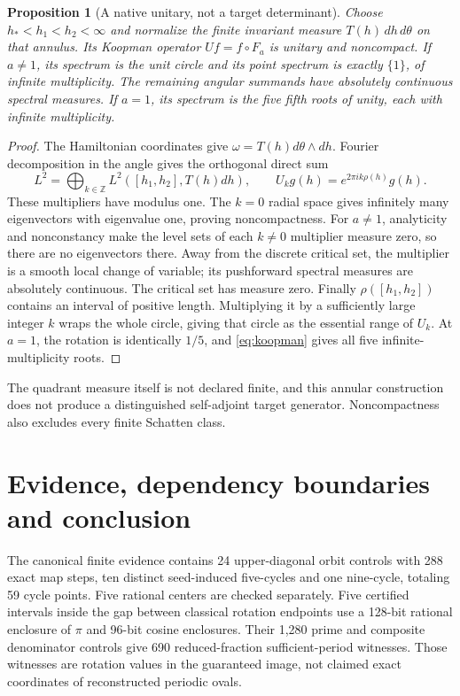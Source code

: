 \documentclass[10pt]{article}
\newcommand{\Z}{\mathbb Z}
\newtheorem{proposition}{Proposition}
\begin{document}
\begin{proposition}[A native unitary, not a target determinant]
Choose $h_*<h_1<h_2<\infty$ and normalize the finite invariant measure
$T(h)\,dh\,d\theta$ on that annulus. Its Koopman operator $Uf=f\circ F_a$
is unitary and noncompact. If $a\ne1$, its spectrum is the unit circle
and its point spectrum is exactly $\{1\}$, of infinite multiplicity.
The remaining angular summands have absolutely continuous spectral
measures. If $a=1$, its spectrum is the five fifth roots of unity, each
with infinite multiplicity.
\end{proposition}
\begin{proof}
The Hamiltonian coordinates give $\omega=T(h)d\theta\wedge dh$.
Fourier decomposition in the angle gives the orthogonal direct sum
\begin{equation}\label{eq:koopman}
 L^2=\bigoplus_{k\in\Z}L^2([h_1,h_2],T(h)dh),\qquad
 U_k g(h)=e^{2\pi i k\rho(h)}g(h).
\end{equation}
These multipliers have modulus one. The $k=0$ radial space gives
infinitely many eigenvectors with eigenvalue one, proving noncompactness.
For $a\ne1$, analyticity and nonconstancy make the level sets of each
$k\ne0$ multiplier measure zero, so there are no eigenvectors there.
Away from the discrete critical set, the multiplier is a smooth local
change of variable; its pushforward spectral measures are absolutely
continuous. The critical set has measure zero. Finally $\rho([h_1,h_2])$
contains an interval of positive length. Multiplying it by a sufficiently
large integer $k$ wraps the whole circle, giving that circle as the
essential range of $U_k$. At $a=1$, the rotation is identically $1/5$,
and \eqref{eq:koopman} gives all five infinite-multiplicity roots.
\end{proof}
The quadrant measure itself is not declared finite, and this annular
construction does not produce a distinguished self-adjoint target
generator. Noncompactness also excludes every finite Schatten class.
\fi

\section{Evidence, dependency boundaries and conclusion}
The canonical finite evidence contains 24 upper-diagonal orbit controls
with 288 exact map steps, ten distinct seed-induced five-cycles and one
nine-cycle, totaling 59 cycle points. Five rational centers are checked
separately. Five certified intervals inside the gap between classical
rotation endpoints use a 128-bit rational enclosure of $\pi$ and 96-bit
cosine enclosures. Their 1,280 prime and composite denominator controls
give 690 reduced-fraction sufficient-period witnesses. Those witnesses
are rotation values in the guaranteed image, not claimed exact coordinates
of reconstructed periodic ovals.
\end{document}
